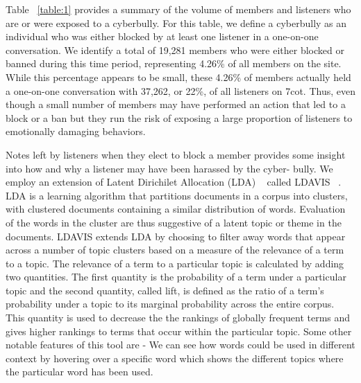Table ~\ref{table:1} provides a summary of the volume of members and listeners who are or were exposed to a cyberbully. For this table, we define a cyberbully as an individual who was either blocked by at least one listener in a one-on-one conversation. We identify a total of 19,281 members who were either blocked or banned during this time period, representing 4.26\% of all members on the site. While this percentage appears to be small, these 4.26\% of members actually held a one-on-one conversation with 37,262, or 22\%, of all listeners on 7cot. Thus, even though a small number of members may have performed an action that led to a block or a ban but they run the risk of exposing a large proportion of listeners to emotionally damaging behaviors.

Notes left by listeners when they elect to block a member provides some insight into how and why a listener may have been harassed by the cyber- bully. We employ an extension of Latent Dirichilet Allocation (LDA) ~\cite{blei2003latent} called LDAVIS ~\cite{sievert2014ldavis}. LDA is a learning algorithm that partitions documents in a corpus into clusters, with clustered documents containing a similar distribution of words. Evaluation of the words in the cluster are thus suggestive of a latent topic or theme in the documents. LDAVIS extends LDA by choosing to filter away words that appear across a number of topic clusters based on a measure of the relevance of a term to a topic. The relevance of a term to a particular topic is calculated by adding two quantities. The first quantity is the probability of a term under a particular topic and the second quantity, called lift, is defined as the ratio of a term’s probability under a topic to its marginal probability across the entire corpus. This quantity is used to decrease the the rankings of globally frequent terms and gives higher rankings to terms that occur within the particular topic. Some other notable features of this tool are - We can see how words could be used in different context by hovering over a specific word which shows the different topics where the particular word has been used.

